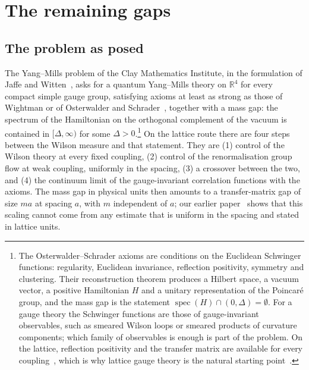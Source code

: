 \documentclass[aps,prd,twocolumn,superscriptaddress,nofootinbib,longbibliography,floatfix,amsmath,amssymb,10pt]{revtex4-2}
\theoremstyle{definition}
\theoremstyle{remark}
\newcommand{\R}{\mathbb{R}}
\begin{document}
\section{The remaining gaps}\label{sec:open}

\subsection{The problem as posed}

The Yang--Mills problem of the Clay Mathematics Institute, in the
formulation of Jaffe and Witten~\cite{JW06}, asks for a quantum Yang--Mills
theory on $\R^4$ for every compact simple gauge group, satisfying axioms at
least as strong as those of Wightman or of Osterwalder and
Schrader~\cite{OS73,OS75}, together with a mass gap: the spectrum of the
Hamiltonian on the orthogonal complement of the vacuum is contained in
$[\Delta,\infty)$ for some $\Delta>0$.\footnote{The Osterwalder--Schrader
axioms are conditions on the Euclidean Schwinger functions: regularity,
Euclidean invariance, reflection positivity, symmetry and clustering. Their
reconstruction theorem produces a Hilbert space, a vacuum vector, a positive
Hamiltonian $H$ and a unitary representation of the Poincar\'e group, and the
mass gap is the statement $\operatorname{spec}(H)\cap(0,\Delta)=\emptyset$.
For a gauge theory the Schwinger functions are those of gauge-invariant
observables, such as smeared Wilson loops or smeared products of curvature
components; which family of observables is enough is part of the problem.
On the lattice, reflection positivity and the transfer matrix are available
for every coupling~\cite{OSei78,Lus77}, which is why lattice gauge theory is
the natural starting point~\cite{Sei82,GJ87}.} On the lattice route there
are four steps between the Wilson measure and that statement. They are
(1) control of the Wilson theory at every fixed coupling, (2) control of the
renormalisation group flow at weak coupling, uniformly in the spacing, (3) a
crossover between the two, and (4) the continuum limit of the gauge-invariant
correlation functions with the axioms. The mass gap in physical units then
amounts to a transfer-matrix gap of size $ma$ at spacing $a$, with $m$
independent of $a$; our earlier paper~\cite{BB26} shows that this scaling
cannot come from any estimate that is uniform in the spacing and stated in
lattice units.
\end{document}
